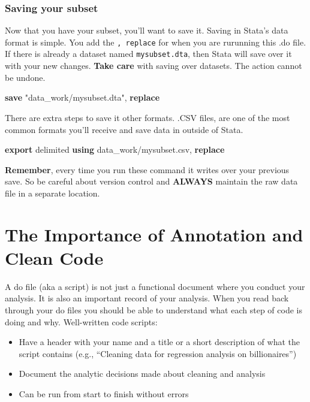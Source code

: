 \documentclass[
]{book}
\newenvironment{Shaded}{\begin{snugshade}}{\end{snugshade}}
\newcommand{\KeywordTok}[1]{\textcolor[rgb]{0.13,0.29,0.53}{\textbf{#1}}}
\newcommand{\NormalTok}[1]{#1}
\newcommand{\StringTok}[1]{\textcolor[rgb]{0.31,0.60,0.02}{#1}}
\providecommand{\tightlist}{%
  \setlength{\itemsep}{0pt}\setlength{\parskip}{0pt}}
\begin{document}
\hypertarget{saving}{%
\subsubsection*{Saving your subset}\label{saving}}

Now that you have your subset, you'll want to save it. Saving in Stata's data format is simple. You add the \texttt{,\ replace} for when you are rurunning this .do file. If there is already a dataset named \texttt{mysubset.dta}, then Stata will save over it with your new changes. \textbf{Take care} with saving over datasets. The action cannot be undone.

\begin{Shaded}
\begin{Highlighting}[]
\KeywordTok{save} \StringTok{"data\_work/mysubset.dta"}\NormalTok{, }\KeywordTok{replace}
\end{Highlighting}
\end{Shaded}

There are extra steps to save it other formats. .CSV files, are one of the most common formats you'll receive and save data in outside of Stata.

\begin{Shaded}
\begin{Highlighting}[]
\KeywordTok{export}\NormalTok{ delimited }\KeywordTok{using}\NormalTok{ data\_work/mysubset.csv, }\KeywordTok{replace} 
\end{Highlighting}
\end{Shaded}

\textbf{Remember}, every time you run these command it writes over your previous save. So be careful about version control and \textbf{ALWAYS} maintain the raw data file in a separate location.

\hypertarget{clean}{%
\section{The Importance of Annotation and Clean Code}\label{clean}}

A do file (aka a script) is not just a functional document where you conduct your analysis. It is also an important record of your analysis. When you read back through your do files you should be able to understand what each step of code is doing and why. Well-written code scripts:

\begin{itemize}
\tightlist
\item
  Have a header with your name and a title or a short description of what the script contains (e.g., ``Cleaning data for regression analysis on billionaires'')
\item
  Document the analytic decisions made about cleaning and analysis
\item
  Can be run from start to finish without errors
\end{itemize}
\end{document}
